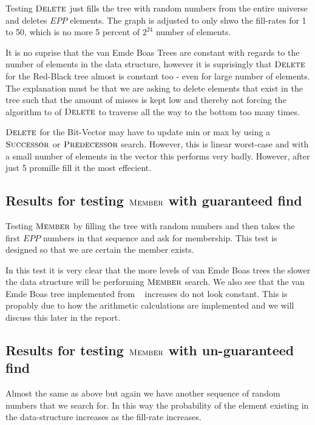 \documentclass[oneside,11pt,openright]{report}
\newcommand{\Delete}{\textsc{Delete}}
\newcommand{\Member}{\textsc{Member}}
\newcommand{\Predecessor}{\textsc{Predecessor}}
\newcommand{\Successor}{\textsc{Successor}}
\begin{document}
Testing $\Delete$ just fills the tree with random numbers from the entire universe and deletes $EPP$ elements. The graph is adjusted to only shwo the fill-rates for 1 to 50, which is no more 5 percent of $2^{24}$ number of elements.



It is no suprise that the van Emde Boas Trees are constant with regards to the number of elements in the data structure, however it is suprisingly that $\Delete$ for the Red-Black tree almost is constant too - even for large number of elements. The explanation must be that we are asking to delete elements that exist in the tree such that the amount of misses is kept low and thereby not forcing the algorithm to of $\Delete$ to traverse all the way to the bottom too many times.

$\Delete$ for the Bit-Vector may have to update min or max by using a $\Successor$ or $\Predecessor$ search. However, this is linear worst-case and with a small number of elements in the vector this performs very badly. However, after just 5 promille fill it the most effecient. 

\subsection{Results for testing $\Member$ with guaranteed find}

Testing $\Member$ by filling the tree with random numbers and then takes the first $EPP$ numbers in that sequence and ask for membership. This test is designed so that we are certain the member exists.



In this test it is very clear that the more levels of van Emde Boas trees the slower the data structure will be performing $\Member$ search. We also see that the van Emde Boas tree implemented from ~\cite{ITA09} increases do not look constant. This is propably due to how the arithmetic calculations are implemented and we will discuss this later in the report.

\subsection{Results for testing $\Member$ with un-guaranteed find}

Almost the same as above but again we have another sequence of random numbers that we search for. In this way the probability of the element existing in the data-structure increases as the fill-rate increases.
\end{document}
